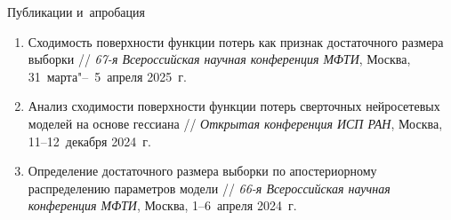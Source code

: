 \documentclass[aspectratio=169]{beamer}
\begin{document}
\begin{frame}{Публикации и~апробация}
\begin{enumerate}
        \item Сходимость поверхности функции потерь как признак достаточного размера выборки // \textit{67-я Всероссийская научная конференция МФТИ}, Москва, 31~марта"--~5~апреля 2025~г.
        \item Анализ сходимости поверхности функции потерь сверточных нейросетевых моделей на основе гессиана // \textit{Открытая конференция ИСП РАН}, Москва, 11--12~декабря 2024~г.
        \item Определение достаточного размера выборки по апостериорному распределению параметров модели // \textit{66-я Всероссийская научная конференция МФТИ}, Москва, 1--6~апреля 2024~г.
    \end{enumerate}
\end{frame}
\end{document}
